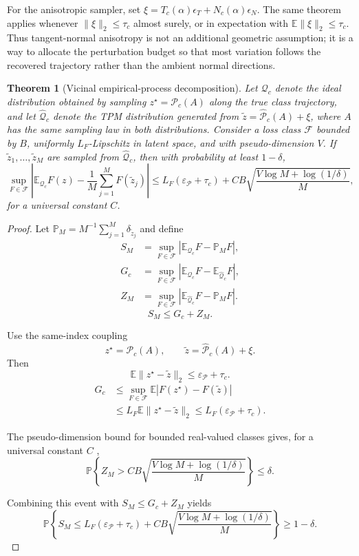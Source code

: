 \documentclass{article}
\newtheorem{theorem}{Theorem}
\begin{document}
For the anisotropic sampler, set $\xi=T_c(\alpha)\epsilon_T+N_c(\alpha)\epsilon_N$. The same theorem applies whenever $\lVert\xi\rVert_2\le\tau_c$ almost surely, or in expectation with $\mathbb{E}\lVert\xi\rVert_2\le\tau_c$. Thus tangent-normal anisotropy is not an additional geometric assumption; it is a way to allocate the perturbation budget so that most variation follows the recovered trajectory rather than the ambient normal directions.

\begin{theorem}[Vicinal empirical-process decomposition]
	Let $\mathcal{Q}_c$ denote the ideal distribution obtained by sampling $z^\star=\mathcal{P}_c(A)$ along the true class trajectory, and let $\widehat{\mathcal{Q}}_c$ denote the TPM distribution generated from $\tilde z=\widehat{\mathcal{P}}_c(A)+\xi$, where $A$ has the same sampling law in both distributions. Consider a loss class $\mathcal{F}$ bounded by $B$, uniformly $L_F$-Lipschitz in latent space, and with pseudo-dimension $V$. If $\tilde z_1,\ldots,\tilde z_M$ are sampled from $\widehat{\mathcal{Q}}_c$, then with probability at least $1-\delta$,
	\[
	\sup_{F\in\mathcal{F}}
	\left|
	\mathbb{E}_{\mathcal{Q}_c}F(z)-
	\frac{1}{M}\sum_{j=1}^{M}F(\tilde z_j)
	\right|
	\le
	L_F(\varepsilon_{\mathcal{P}}+\tau_c)
	+
	CB\sqrt{\frac{V\log M+\log(1/\delta)}{M}},
	\]
	for a universal constant $C$.
\end{theorem}

\begin{proof}
	Let $\mathbb{P}_M=M^{-1}\sum_{j=1}^{M}\delta_{\tilde z_j}$ and define
	\[
	\begin{aligned}
	S_M
	&=
	\sup_{F\in\mathcal{F}}
	\left|
	\mathbb{E}_{\mathcal{Q}_c}F-\mathbb{P}_M F
	\right|,\\
	G_c
	&=
	\sup_{F\in\mathcal{F}}
	\left|
	\mathbb{E}_{\mathcal{Q}_c}F-\mathbb{E}_{\widehat{\mathcal{Q}}_c}F
	\right|,\\
	Z_M
	&=
	\sup_{F\in\mathcal{F}}
	\left|
	\mathbb{E}_{\widehat{\mathcal{Q}}_c}F-\mathbb{P}_M F
	\right|.
	\end{aligned}
	\]
	\[
	S_M\le G_c+Z_M .
	\]

	Use the same-index coupling
	\[
	z^\star=\mathcal{P}_c(A),\qquad
	\tilde z=\widehat{\mathcal{P}}_c(A)+\xi .
	\]
	Then
	\[
	\mathbb{E}\lVert z^\star-\tilde z\rVert_2
	\le
	\varepsilon_{\mathcal{P}}+\tau_c .
	\]
	\[
	\begin{aligned}
	G_c
	&\le
	\sup_{F\in\mathcal{F}}
	\mathbb{E}\left|F(z^\star)-F(\tilde z)\right|\\
	&\le
	L_F\mathbb{E}\lVert z^\star-\tilde z\rVert_2
	\le
	L_F(\varepsilon_{\mathcal{P}}+\tau_c).
	\end{aligned}
	\]

	The pseudo-dimension bound for bounded real-valued classes gives, for a universal constant $C$ \citep{vapnik1998statistical, vandervaart1996weak, wainwright2019high},
	\[
	\mathbb{P}\left\{
	Z_M>
	CB\sqrt{\frac{V\log M+\log(1/\delta)}{M}}
	\right\}
	\le\delta .
	\]

	Combining this event with $S_M\le G_c+Z_M$ yields
	\[
	\mathbb{P}\left\{
	S_M
	\le
	L_F(\varepsilon_{\mathcal{P}}+\tau_c)
	+
	CB\sqrt{\frac{V\log M+\log(1/\delta)}{M}}
	\right\}
	\ge
	1-\delta .
	\]
\end{proof}
\end{document}
